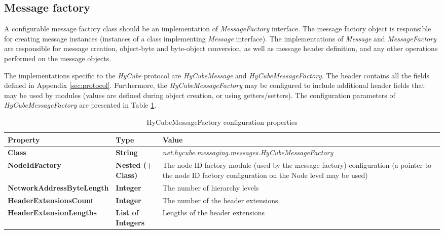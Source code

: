 \subsection{Message factory}

A configurable message factory class should be an implementation of \emph{MessageFactory} interface. The message factory object is responsible for creating message instances (instances of a class implementing \emph{Message} interface). The implementations of \emph{Message} and \emph{MessageFactory} are responsible for message creation, object-byte and byte-object conversion, as well as message header definition, and any other operations performed on the message objects.

The implementations specific to the \emph{HyCube} protocol are \emph{HyCubeMessage} and \emph{HyCubeMessageFactory}. The header contains all the fields defined in Appendix \ref{sec:protocol}. Furthermore, the \emph{HyCubeMessageFactory} may be configured to include additional header fields that may be used by modules (values are defined during object creation, or using getters/setters). The configuration parameters of \emph{HyCubeMessageFactory} are presented in Table \ref{tab:libPropHyCubeMessageFactory}.

\begin{table}
\scriptsize
\begin{center}
\begin{tabular}{p{3.5cm} p{2.5cm} p{8.5cm}}
	\hline
	\textbf{Property}						& \textbf{Type}					& \textbf{Value}					\\[1mm]
    \hline
	\textbf{Class}							& \textbf{String}				& \textit{net.hycube.messaging.messages.HyCubeMessageFactory}			\\[1.5mm]
    \textbf{NodeIdFactory}					& \textbf{Nested (+ Class)}		& The node ID factory module (used by the message factory) configuration (a pointer to the node ID factory configuration on the Node level may be used)				\\[1.5mm]
	\textbf{NetworkAddressByteLength}		& \textbf{Integer}				& The number of hierarchy levels											\\[1.5mm]
	\textbf{HeaderExtensionsCount}			& \textbf{Integer}				& The number of the header extensions										\\[1.5mm]
	\textbf{HeaderExtensionLengths}			& \textbf{List of Integers}		& Lengths of the header extensions											\\[1.5mm]
    \hline
\end{tabular}
\end{center}
\caption{HyCubeMessageFactory configuration properties}
\label{tab:libPropHyCubeMessageFactory}
\end{table}







